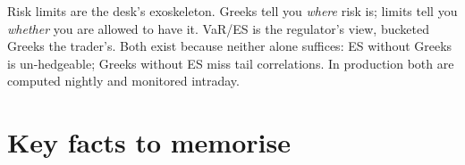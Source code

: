 \begin{intuitionbox}
Risk limits are the desk's exoskeleton.  Greeks tell you
\emph{where} risk is; limits tell you \emph{whether} you are
allowed to have it.  VaR/ES is the regulator's view, bucketed
Greeks the trader's.  Both exist because neither alone suffices:
ES without Greeks is un-hedgeable; Greeks without ES miss tail
correlations.  In production both are computed nightly and
monitored intraday.
\end{intuitionbox}


\section{Key facts to memorise}

